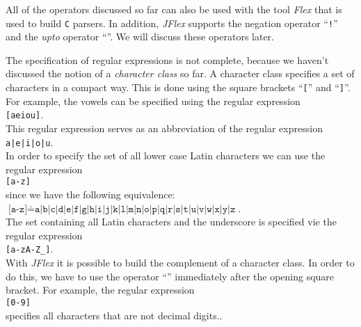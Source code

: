 All of the operators discussed so far can also be used with the tool  \textsl{Flex} that is used to
build \texttt{C} parsers. In addition, \textsl{JFlex} supports the negation operator ``\texttt{!}''
and the  \textsl{upto} operator ``\texttt{}''.  We will discuss these operators later.

The specification of regular expressions is not complete, because we haven't  discussed the notion of a 
\emph{character class} so far.  A character class specifies a set of characters in a compact way.
This is done using the square brackets ``\texttt{[}'' and ``\texttt{]}''.
For example, the vowels can be specified using the regular expression
\\[0.2cm]
\hspace*{1.3cm}
\texttt{[aeiou]}.
\\[0.2cm]
This regular expression serves as an abbreviation of the regular expression
\\[0.2cm]
\hspace*{1.3cm}
\texttt{a|e|i|o|u}.
\\[0.2cm]
In order to specify the set of all lower case Latin characters we can use the regular expression
\\[0.2cm]
\hspace*{1.3cm}
\texttt{[a-z]}
\\[0.2cm]
since we have the following equivalence:
\\[0.2cm]
\hspace*{1.3cm}
$\texttt{[a-z]} \doteq \texttt{a|b|c|d|e|f|g|h|i|j|k|l|m|n|o|p|q|r|s|t|u|v|w|x|y|z}$.
\\[0.2cm]
The set containing  all Latin characters and the underscore is specified vie the regular expression
\\[0.2cm]
\hspace*{1.3cm}
\texttt{[a-zA-Z\_]}.
\\[0.2cm]
With \textsl{JFlex} it is possible to build the complement of a character class.  In order to do
this, we have to use the operator ``\texttt{}'' immediately after the opening square
bracket.  For example, the regular expression
\\[0.2cm]
\hspace*{1.3cm}
\texttt{[0-9]}
\\[0.2cm]
specifies all characters that are not decimal digits..  


